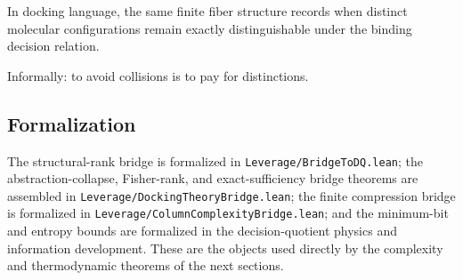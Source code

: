 In docking language, the same finite fiber structure records when distinct molecular configurations remain exactly distinguishable under the binding decision relation.

Informally: to avoid collisions is to pay for distinctions.

\subsection{Formalization}

The structural-rank bridge is formalized in \texttt{Leverage/BridgeToDQ.lean}; the abstraction-collapse, Fisher-rank, and exact-sufficiency bridge theorems are assembled in \texttt{Leverage/DockingTheoryBridge.lean}; the finite compression bridge is formalized in \texttt{Leverage/ColumnComplexityBridge.lean}; and the minimum-bit and entropy bounds are formalized in the decision-quotient physics and information development. These are the objects used directly by the complexity and thermodynamic theorems of the next sections.
